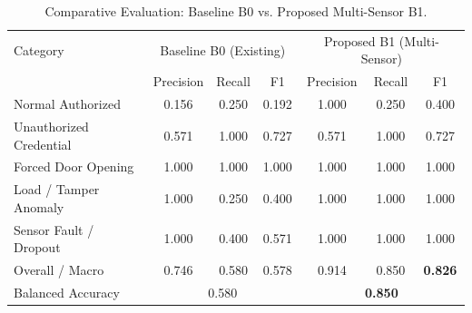 \begin{table}[!htbp]
\renewcommand{\arraystretch}{1.05}
\centering
\small
\caption{Comparative Evaluation: Baseline B0 vs. Proposed Multi-Sensor B1.}
\label{tab:b0_vs_b1}
\vspace{5pt}
\begin{tabular}{l c c c c c c}
\hline
Category & \multicolumn{3}{c}{Baseline B0 (Existing)} & \multicolumn{3}{c}{Proposed B1 (Multi-Sensor)} \\
 & Precision & Recall & F1 & Precision & Recall & F1 \\
\hline
Normal Authorized & 0.156 & 0.250 & 0.192 & 1.000 & 0.250 & 0.400 \\
Unauthorized Credential & 0.571 & 1.000 & 0.727 & 0.571 & 1.000 & 0.727 \\
Forced Door Opening & 1.000 & 1.000 & 1.000 & 1.000 & 1.000 & 1.000 \\
Load / Tamper Anomaly & 1.000 & 0.250 & 0.400 & 1.000 & 1.000 & 1.000 \\
Sensor Fault / Dropout & 1.000 & 0.400 & 0.571 & 1.000 & 1.000 & 1.000 \\
\hline
Overall / Macro & 0.746 & 0.580 & 0.578 & 0.914 & 0.850 & \textbf{0.826} \\
Balanced Accuracy & \multicolumn{3}{c}{0.580} & \multicolumn{3}{c}{\textbf{0.850}} \\
\hline
\end{tabular}
\end{table}
